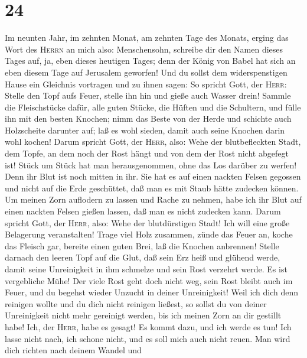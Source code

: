 \hypertarget{section-23}{%
\section{24}\label{section-23}}

 Im neunten Jahr, im zehnten Monat, am zehnten Tage des
Monats, erging das Wort des \textsc{Herrn} an mich also: 
Menschensohn, schreibe dir den Namen dieses Tages auf, ja, eben dieses
heutigen Tages; denn der König von Babel hat sich an eben diesem Tage
auf Jerusalem geworfen!  Und du sollst dem widerspenstigen
Hause ein Gleichnis vortragen und zu ihnen sagen: So spricht Gott, der
\textsc{Herr}: Stelle den Topf aufs Feuer, stelle ihn hin und gieße auch
Wasser drein!  Sammle die Fleischstücke dafür, alle guten
Stücke, die Hüften und die Schultern, und fülle ihn mit den besten
Knochen;  nimm das Beste von der Herde und schichte auch
Holzscheite darunter auf; laß es wohl sieden, damit auch seine Knochen
darin wohl kochen!  Darum spricht Gott, der \textsc{Herr},
also: Wehe der blutbefleckten Stadt, dem Topfe, an dem noch der Rost
hängt und von dem der Rost nicht abgefegt ist! Stück um Stück hat man
herausgenommen, ohne das Los darüber zu werfen!  Denn ihr
Blut ist noch mitten in ihr. Sie hat es auf einen nackten Felsen
gegossen und nicht auf die Erde geschüttet, daß man es mit Staub hätte
zudecken können.  Um meinen Zorn auflodern zu lassen und
Rache zu nehmen, habe ich ihr Blut auf einen nackten Felsen gießen
lassen, daß man es nicht zudecken kann.  Darum spricht
Gott, der \textsc{Herr}, also: Wehe der blutdürstigen Stadt! Ich will
eine große Belagerung veranstalten!  Trage viel Holz
zusammen, zünde das Feuer an, koche das Fleisch gar, bereite einen guten
Brei, laß die Knochen anbrennen!  Stelle darnach den
leeren Topf auf die Glut, daß sein Erz heiß und glühend werde, damit
seine Unreinigkeit in ihm schmelze und sein Rost verzehrt werde.
 Es ist vergebliche Mühe! Der viele Rost geht doch nicht
weg, sein Rost bleibt auch im Feuer, und du begehst wieder Unzucht in
deiner Unreinigkeit!  Weil ich dich denn reinigen wollte
und du dich nicht reinigen ließest, so sollst du von deiner Unreinigkeit
nicht mehr gereinigt werden, bis ich meinen Zorn an dir gestillt habe!
 Ich, der \textsc{Herr}, habe es gesagt! Es kommt dazu,
und ich werde es tun! Ich lasse nicht nach, ich schone nicht, und es
soll mich auch nicht reuen. Man wird dich richten nach deinem Wandel und
